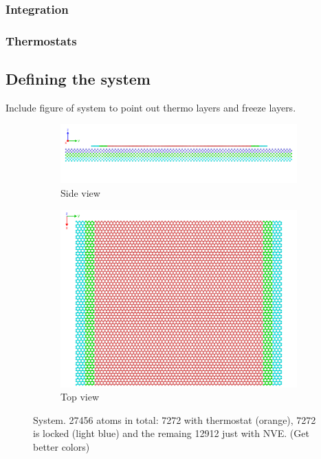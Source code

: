\subsubsection{Integration}
\subsubsection{Thermostats}



\subsection{Defining the system}
Include figure of system to point out thermo layers and freeze layers.


\begin{figure}[H]
  \centering
  \begin{subfigure}[b]{0.80\textwidth}
      \centering
      \includegraphics[width=\textwidth]{figures/system_sideview.png}
      \caption{Side view}
      \label{fig:sideview}
  \end{subfigure}
  \hfill
  \begin{subfigure}[b]{0.80\textwidth}
      \centering
      \includegraphics[width=\textwidth]{figures/system_topview.png}
      \caption{Top view}
      \label{fig:topview}
  \end{subfigure}
  \hfill
     \caption{System. 27456 atoms in total: 7272 with thermostat (orange), 7272 is locked (light blue) and the remaing 12912 just with NVE. (Get better colors)}
     \label{fig:system}
\end{figure}

